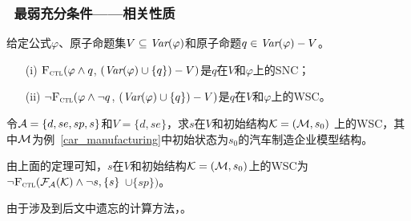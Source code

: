 \documentclass[9pt, CJK]{beamer}
\begin{document}
	\begin{frame}
		\frametitle{~最弱充分条件——{\footnotesize 相关性质}}
		{\footnotesize
			\begin{theorem}\label{thm:SNC:WSC:forget}
				给定公式$\varphi$、原子命题集$V\subseteq\textit{Var}(\varphi)$和原子命题$q\in\textit{Var}(\varphi)- V$。
				\begin{itemize}
					\item[(i)] ${\textsc{F}_{\textsc{ctl}}} (\varphi \land q$, $(\textit{Var}(\varphi) \cup \{q\}) - V)$是$q$在$V$和$\varphi$上的SNC；
					\item[(ii)]  $\neg{\textsc{F}_{\textsc{ctl}}} (\varphi \land \neg q$, $(\textit{Var}(\varphi) \cup \{q\}) - V)$是$q$在$V$和$\varphi$上的WSC。
				\end{itemize}
			\end{theorem}
			\begin{example}
				\label{exam:SNCandWSC}
				令${\cal A}=\{d,se,sp,s\}$和$V=\{d,se\}$，求$s$在$V$和初始结构${\cal K} = ({\cal M},s_0)$ 上的WSC，其中${\cal M}$为例~\ref{car_manufacturing}中初始状态为$s_0$的汽车制造企业模型结构。
				
				由上面的定理可知，$s$在$V$和初始结构${\cal K} = ({\cal M},s_0)$上的WSC为$\neg {\textsc{F}_{\textsc{ctl}}}({\cal F}_{{\cal A}}({\cal K}) \wedge \neg s, \{s\}$ $\cup \{sp\})$。
				
				由于涉及到后文中遗忘的计算方法，。
			\end{example}
		}
	\end{frame}
	
\end{document}
